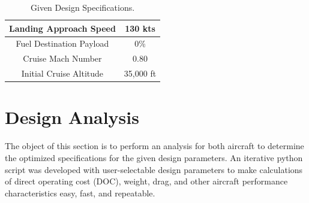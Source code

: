 \documentclass{article}
\begin{document}
\begin{table}[ht]
\begin{tabular}{|c|c|}
            Landing Approach Speed                & 130 kts                          \\ \hline
            \rowcolor[HTML]{C0C0C0}
            Fuel Destination Payload              & 0\%                              \\ \hline
            Cruise Mach Number                    & 0.80                             \\ \hline
            \rowcolor[HTML]{C0C0C0}
            Initial Cruise Altitude               & 35,000 ft                        \\ \hline
        \end{tabular}
        \caption{Given Design Specifications.}
    \end{table}

    \section{Design Analysis}
    \label{sec:design}
    \begin{flushleft}
        The object of this section is to perform an analysis for both aircraft
        to determine the optimized specifications for the given design
        parameters. An iterative python script was developed with
        user-selectable design parameters to make calculations of direct
        operating cost (DOC), weight, drag, and other aircraft performance
        characteristics easy, fast, and repeatable.
    \end{flushleft}
\end{document}
